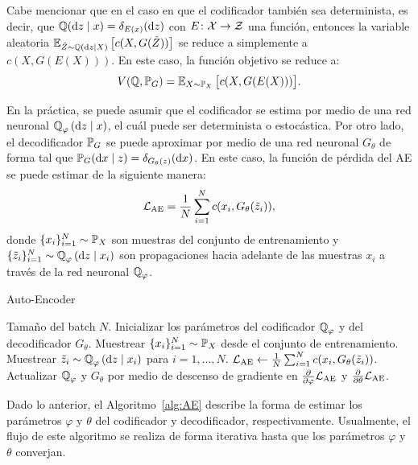 {{Cabe mencionar que en el caso en que el codificador también sea determinista, es decir, que $\ProbQ(\dz \mid x) = \delta_{E(x)}(\dz)$ con $E\colon \mathcal{X} \to \mathcal{Z}$ una función, entonces la variable aleatoria
$\Exp_{\tilde Z \sim \ProbQ(\dz \mid X)} \qty\big[ c(X, G(\tilde Z)) ]$ se reduce a simplemente a $c(X, G(E(X)))$. En este caso, la función objetivo se reduce a:
\begin{equation}\label{eq:ae-obj-func-deterministic}
    V(\ProbQ, \Prob_G) = \Exp_{X \sim \Prob_X} \qty\big[ c(X, G(E(X))) ].
\end{equation}

En la práctica, se puede asumir que el codificador se estima por medio de una red neuronal $\ProbQ_\varphi \left( \dd z \mid x \right)$, el cuál puede ser determinista o estocástica. Por otro lado, el decodificador $\Prob_G$ se puede aproximar por medio de una red neuronal $G_\theta$ de forma tal que $\Prob_G(\dd x \mid z) = \delta_{G_\theta(z)}(\dd x)$.
En este caso, la función de pérdida del AE se puede estimar de la siguiente manera:
\begin{equation}
    \mathcal{L}_{\mathrm{AE}} = \frac{1}{N}\sum_{i=1}^{N} c(x_i, G_\theta(\tilde z_i)),
\end{equation}
donde $\{x_i\}_{i=1}^{N} \sim \Prob_X$ son muestras del conjunto de entrenamiento y $\{\tilde z_i\}_{i=1}^{N} \sim \ProbQ_\varphi \left( \dd z \mid x_i \right)$ son propagaciones hacia adelante de las muestras $x_i$ a través de la red neuronal $\ProbQ_\varphi$.

\begin{algorithm}[t!]
    \caption{Auto-Encoder}\label{alg:AE}
    \begin{algorithmic}[1]
        \Require Tamaño del batch $N$.
        \State Inicializar los parámetros del codificador $\ProbQ_\varphi$ y del decodificador $G_\theta$.
        \State Muestrear $\{x_i\}_{i=1}^{N} \sim \Prob_X$ desde el conjunto de entrenamiento.
        \State Muestrear $\tilde z_i \sim \ProbQ_\varphi \left( \dd z \mid x_i \right)$ para $i=1,\ldots,N$.
        \State $\mathcal{L}_{\mathrm{AE}}\gets \frac{1}{N}\sum_{i=1}^{N} c(x_i, G_\theta(\tilde z_i))$.
        \State Actualizar $\ProbQ_\varphi$ y $G_\theta$ por medio de descenso de gradiente en $\pdv{\varphi} \cL_{\mathrm{AE}}$ y $\pdv{\theta} \mathcal{L}_{\mathrm{AE}}$.
        \EndWhile
    \end{algorithmic}

\end{algorithm}

Dado lo anterior, el Algoritmo~\ref{alg:AE} describe la forma de estimar los parámetros $\varphi$ y $\theta$ del codificador y decodificador, respectivamente. Usualmente, el flujo de este algoritmo se realiza de forma iterativa hasta que los parámetros $\varphi$ y $\theta$ converjan.

}  %


}  %